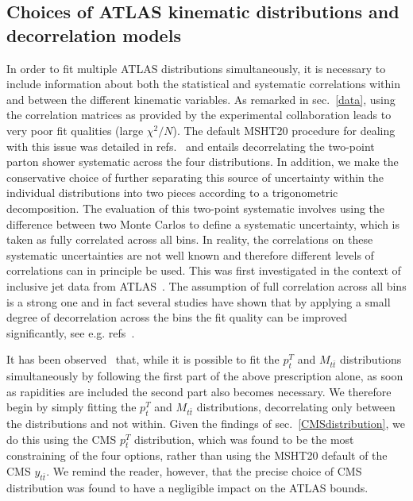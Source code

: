 \documentclass[sn-mathphys]{sn-jnl}%
\newcommand{\pT}{p^T_t}
\newcommand{\mtt}{M_{t\bar{t}}}
\newcommand{\ytt}{y_{t\bar{t}}}
\begin{document}
\subsection{Choices of ATLAS kinematic distributions and decorrelation models}
In order to fit multiple ATLAS distributions simultaneously, it is necessary to include information about both the statistical and systematic correlations within and between the different kinematic variables. As remarked in sec.~\ref{data}, using the correlation matrices as provided by the experimental collaboration leads to very poor fit qualities (large $\chi^2/N$). The default MSHT20 procedure for dealing with this issue was detailed in refs.~\cite{Bailey:2019yze,Bailey:2020ooq} and entails decorrelating the two-point parton shower systematic across the four distributions. In addition, we make the conservative choice of further separating this source of uncertainty within the individual distributions into two pieces according to a trigonometric decomposition. The evaluation of this two-point systematic involves using the difference between two Monte Carlos to define a systematic uncertainty, which is taken as fully correlated across all bins. In reality, the correlations on these systematic uncertainties are not well known and therefore different levels of correlations can in principle be used. This was first investigated in the context of inclusive jet data from ATLAS~\cite{ATLAS:2017kux}. The assumption of full correlation across all bins is a strong one and in fact several studies have shown that by applying a small degree of decorrelation across the bins the fit quality can be improved significantly, see e.g. refs~\cite{Bailey:2019yze,Bailey:2020ooq}.

It has been observed~\cite{Bailey:2019yze,Hou:2019gfw,Amat:2019upj,Kadir:2020yml} that, while it is possible to fit the $\pT$ and $\mtt$ distributions simultaneously by following the first part of the above prescription alone, as soon as rapidities are included the second part also becomes necessary. We therefore begin by simply fitting the $\pT$ and $\mtt$ distributions, decorrelating only between the distributions and not within. Given the findings of sec.~\ref{CMSdistribution}, we do this using the CMS $\pT$ distribution, which was found to be the most constraining of the four options, rather than using the MSHT20 default of the CMS $\ytt$. We remind the reader, however, that the precise choice of CMS distribution was found to have a negligible impact on the ATLAS bounds.
\end{document}
